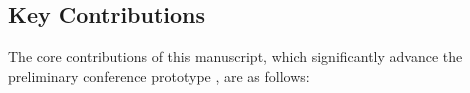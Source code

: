 \documentclass[conference]{IEEEtran}
\begin{document}


\subsection{Key Contributions}
The core contributions of this manuscript, which significantly advance the preliminary conference prototype \cite{ajakweconquest}, are as follows:
\end{document}
